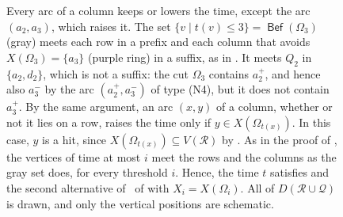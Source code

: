\documentclass[fontsize=12pt,leading=14pt]{fullpaper}
\DeclareMathOperator{\Bef}{\mathsf{Bef}}
\newcommand{\Qcal}{\mathcal{Q}}
\newcommand{\Rcal}{\mathcal{R}}
\begin{document}
\begin{figure}[ht]
{    Every arc of a column keeps or lowers the time, except the arc $(a_2,a_3)$, which raises it.
    The set $\{v\mid t(v)\le3\}=\Bef(\Omega_3)$ (gray) meets each row in a prefix and each column that avoids $X(\Omega_3)=\{a_3\}$ (purple ring) in a suffix, as in .
    It meets $Q_2$ in $\{a_2,d_2\}$, which is not a suffix: the cut $\Omega_3$ contains $a_2^+$, and hence also $a_3^-$ by the arc $(a_2^+,a_3^-)$ of type (N4), but it does not contain $a_3^+$.
    By the same argument, an arc $(x,y)$ of a column, whether or not it lies on a row, raises the time only if $y\in X(\Omega_{t(x)})$.
    In this case, $y$ is a hit, since $X(\Omega_{t(x)})\subseteq V(\Rcal)$ by .
    As in the proof of , the vertices of time at most $i$ meet the rows and the columns as the gray set does, for every threshold $i$.
    Hence, the time $t$ satisfies  and the second alternative of~ of  with $X_i=X(\Omega_i)$.
  All of $D(\Rcal\cup\Qcal)$ is drawn, and only the vertical positions are schematic.}
  \label{fig:residual-clock}
\end{figure}
\end{document}
